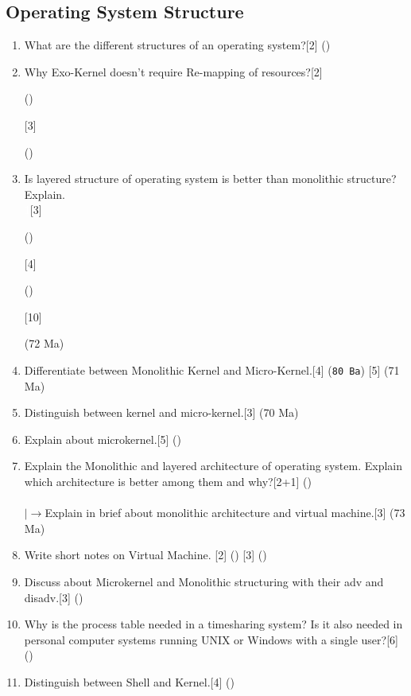 \documentclass[12pt]{article}
\newcommand{\lb}{\\$\left|\rightarrow\right.$}
\newcommand{\enter}{\\\textcolor{white}{1}}
\begin{document}
	\subsection{Operating System Structure}
	\begin{enumerate}
	\item What are the different structures of an operating system?\hfill[2] ()
	\item Why Exo-Kernel doesn't require Re-mapping of resources?\hfill[2] \begin{small}()\end{small} [3] \begin{small}()\end{small}
	\item Is layered structure of operating system is better than monolithic structure? Explain.
	\enter \hfill[3] \begin{small}()\end{small} [4] \begin{small}()\end{small} [10] \begin{small}(72 Ma)\end{small}
	\item Differentiate between Monolithic Kernel and Micro-Kernel.\hfill[4] (\texttt{80 Ba}) [5] (71 Ma)
	\item Distinguish between kernel and micro-kernel.\hfill[3] (70 Ma)
	\item Explain about microkernel.\hfill[5] ()
	\item Explain the Monolithic and layered architecture of operating system. Explain which architecture is better among them and why?\hspace{6.7cm}[2+1] ()\\
	\lb Explain in brief about monolithic architecture and virtual machine.\hfill[3] (73 Ma)

	\item Write short notes on Virtual Machine. \hfill [2] () [3] ()

	\item Discuss about Microkernel and Monolithic structuring with their adv and disadv.[3] () 
	\item Why is the process table needed in a timesharing system? Is it also needed in personal computer systems running UNIX or Windows with a single user?\hfill[6] ()
	\item Distinguish between Shell and Kernel.\hfill[4] ()
	\end{enumerate}
\end{document}
